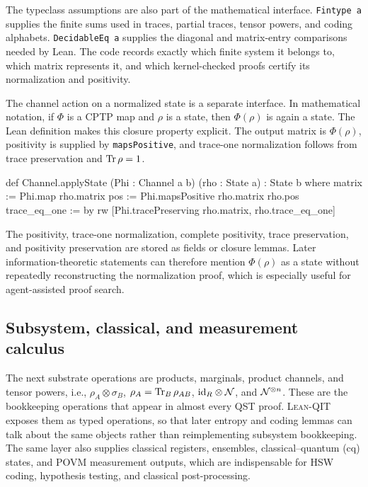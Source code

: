\documentclass[10pt,a4paper]{article}
\DeclareRobustCommand{\LeanQIT}{\textnormal{\textsc{Lean-QIT}}}
\begin{document}
The typeclass assumptions are also part of the mathematical interface.
\texttt{Fintype a} supplies the finite sums used in traces, partial traces,
tensor powers, and coding alphabets. \texttt{DecidableEq a} supplies the
diagonal and matrix-entry comparisons needed by Lean.  The code records exactly which finite system it belongs to, which matrix represents it, and which kernel-checked proofs certify its normalization and positivity.

The channel action on a normalized state is a separate interface.  In
mathematical notation, if $\Phi$ is a CPTP map and $\rho$ is a state, then
$\Phi(\rho)$ is again a state.  The Lean definition makes this closure
property explicit. The output matrix is $\Phi(\rho)$, positivity is supplied
by \texttt{mapsPositive}, and trace-one normalization follows from trace
preservation and $\operatorname{Tr}\rho=1$.
	
\begin{qitleancode}[title={Channels preserve normalized states}]
def Channel.applyState (Phi : Channel a b) (rho : State a) : State b where
  matrix := Phi.map rho.matrix
  pos := Phi.mapsPositive rho.matrix rho.pos
  trace_eq_one := by
    rw [Phi.tracePreserving rho.matrix, rho.trace_eq_one]
\end{qitleancode}
	
The positivity, trace-one normalization, complete positivity, trace preservation, and positivity preservation are stored as fields or closure lemmas.  Later information-theoretic statements can therefore mention $\Phi(\rho)$ as a state without repeatedly reconstructing the normalization proof, which is especially useful for agent-assisted proof
search.
	
\subsection{Subsystem, classical, and measurement calculus}
\label{subsec:subsystem-classical-measurement}

The next substrate operations are products, marginals, product channels, and
tensor powers, i.e., $\rho_A\otimes\sigma_B$, $\rho_A=\operatorname{Tr}_B\rho_{AB}$,
${\operatorname{id}}_R\otimes{\cal N}$, and ${\cal N}^{\otimes n}$. These are the bookkeeping operations that appear in almost every QST proof.  \LeanQIT{} exposes them as
typed operations, so that later entropy and coding lemmas can talk about the
same objects rather than reimplementing subsystem bookkeeping.  The same
layer also supplies classical registers, ensembles, classical--quantum (cq)
states, and POVM measurement outputs, which are indispensable for HSW coding, hypothesis testing, and classical post-processing.
\end{document}

